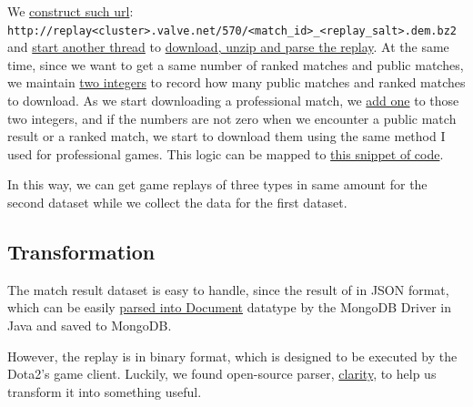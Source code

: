 \documentclass{article}
\newcommand{\codeinline}[1]{
    \texttt{#1}
}
\begin{document}
We \href{https://github.com/Vopaaz/big-data-psg-lgd/blob/a9a285e0e29c0d9e56b41994875df830c7e7b51b/src/main/java/FetchStore/OpendotaAPI.java#L17-L70}{construct such url}: \codeinline{http://replay<cluster>.valve.net/570/<match_id>_<replay_salt>.dem.bz2} and \href{https://github.com/Vopaaz/big-data-psg-lgd/blob/a9a285e0e29c0d9e56b41994875df830c7e7b51b/src/main/java/FetchStore/ValveAPI.java#L131-L144}{start another thread} to \href{https://github.com/Vopaaz/big-data-psg-lgd/blob/a9a285e0e29c0d9e56b41994875df830c7e7b51b/src/main/java/FetchStore/ValveAPI.java#L389-L420}{download, unzip and parse the replay}.
At the same time, since we want to get a same number of ranked matches and public matches, we maintain \href{https://github.com/Vopaaz/big-data-psg-lgd/blob/a9a285e0e29c0d9e56b41994875df830c7e7b51b/src/main/java/FetchStore/ValveAPI.java#L46-L47}{two integers} to record how many public matches and ranked matches to download.
As we start downloading a professional match, we \href{https://github.com/Vopaaz/big-data-psg-lgd/blob/a9a285e0e29c0d9e56b41994875df830c7e7b51b/src/main/java/FetchStore/ValveAPI.java#L111-L112}{add one} to those two integers, and if the numbers are not zero when we encounter a public match result or a ranked match, we start to download them using the same method I used for professional games.
This logic can be mapped to \href{https://github.com/Vopaaz/big-data-psg-lgd/blob/a9a285e0e29c0d9e56b41994875df830c7e7b51b/src/main/java/FetchStore/ValveAPI.java#L104-L129}{this snippet of code}.

In this way, we can get game replays of three types in same amount for the second dataset while we collect the data for the first dataset.

\subsection{Transformation}

The match result dataset is easy to handle, since the result of in JSON format, which can be easily \href{https://github.com/Vopaaz/big-data-psg-lgd/blob/9916e0a5a95245062d110446eb4014312087ef9e/src/main/java/FetchStore/ValveAPI.java#L164-L178}{parsed into Document} datatype by the MongoDB Driver in Java and saved to MongoDB.

However, the replay is in binary format, which is designed to be executed by the Dota2's game client. Luckily, we found open-source parser, \href{https://github.com/skadistats/clarity}{clarity}, to help us transform it into something useful.
\end{document}
